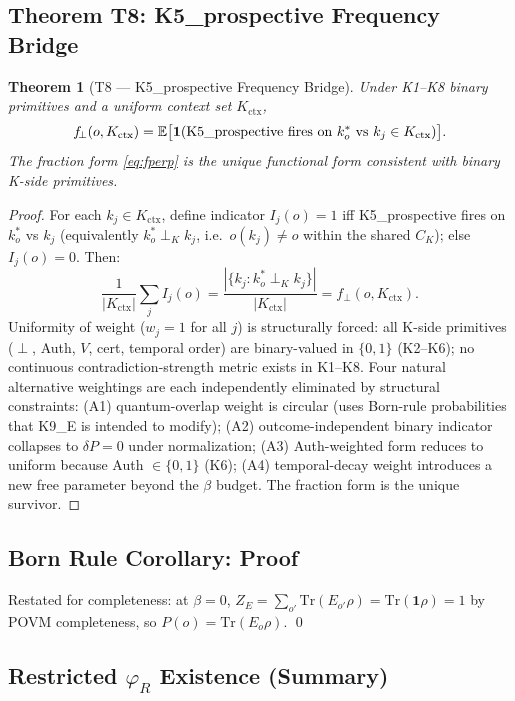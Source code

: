 \documentclass[12pt,a4paper]{article}
\theoremstyle{plain}
\newtheorem{theorem}{Theorem}[section]
\theoremstyle{definition}
\theoremstyle{remark}
\newcommand{\Kctx}{K_{\mathrm{ctx}}}
\newcommand{\fperp}{f_{\!\perp}}
\newcommand{\CK}{C_K}
\begin{document}
\subsection{Theorem T8: K5\_prospective Frequency Bridge}
\label{app:T8}

\begin{theorem}[T8 --- K5\_prospective Frequency Bridge]\label{thm:T8}
Under K1--K8 binary primitives and a uniform context set $\Kctx$,
\[
  \fperp(o, \Kctx)
  = \mathbb{E}\bigl[\mathbf{1}(\textup{K5\_prospective fires on }k_o^*
    \textup{ vs }k_j \in \Kctx)\bigr].
\]
The fraction form \eqref{eq:fperp} is the unique functional form
consistent with binary K-side primitives.
\end{theorem}

\begin{proof}
For each $k_j \in \Kctx$, define indicator
$I_j(o) = 1$ iff K5\_prospective fires on $k_o^*$ vs $k_j$
(equivalently $k_o^* \perp_K k_j$, i.e.\ $o(k_j) \neq o$ within the shared
$\CK$); else $I_j(o) = 0$. Then:
\[
  \frac{1}{|\Kctx|}\sum_j I_j(o)
  = \frac{|\{k_j : k_o^* \perp_K k_j\}|}{|\Kctx|}
  = \fperp(o, \Kctx).
\]
Uniformity of weight ($w_j = 1$ for all $j$) is structurally forced:
all K-side primitives ($\perp$, Auth, $V$, cert, temporal order) are
binary-valued in $\{0,1\}$ (K2--K6); no continuous
contradiction-strength metric exists in K1--K8.
Four natural alternative weightings are each independently eliminated
by structural constraints: (A1) quantum-overlap weight is circular
(uses Born-rule probabilities that K9\_E is intended to modify);
(A2) outcome-independent binary indicator collapses to $\delta P = 0$
under normalization; (A3) Auth-weighted form reduces to uniform because
Auth $\in \{0,1\}$ (K6); (A4) temporal-decay weight introduces a new
free parameter beyond the $\beta$ budget. The fraction form is the
unique survivor.
\end{proof}

\subsection{Born Rule Corollary: Proof}
\label{app:born}

Restated for completeness: at $\beta = 0$,
$Z_E = \sum_{o'}\mathrm{Tr}(E_{o'}\rho) = \mathrm{Tr}(\mathbf{1}\rho) = 1$
by POVM completeness, so $P(o) = \mathrm{Tr}(E_o\rho)$. \qed

\subsection{Restricted $\varphi_R$ Existence (Summary)}
\label{app:phiR}
\end{document}
